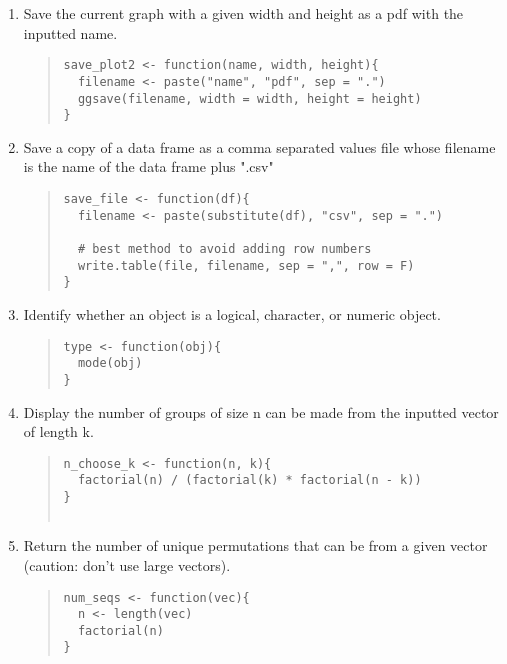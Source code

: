 \documentclass{article}
\begin{document}
\begin{enumerate}
\item Save the current graph with a given width and height as a pdf with the inputted name.
  \begin{quote}
    \begin{verbatim}
save_plot2 <- function(name, width, height){
  filename <- paste("name", "pdf", sep = ".")
  ggsave(filename, width = width, height = height)
}    
    \end{verbatim}
  \end{quote}
  
\item Save a copy of a data frame as a comma separated values file whose filename is the name of the data frame plus ".csv"
  \begin{quote}
    \begin{verbatim}
save_file <- function(df){
  filename <- paste(substitute(df), "csv", sep = ".")

  # best method to avoid adding row numbers
  write.table(file, filename, sep = ",", row = F)
}

    \end{verbatim}
  \end{quote}

\item Identify whether an object is a logical, character, or numeric object.
  \begin{quote}
    \begin{verbatim}
type <- function(obj){
  mode(obj)
}
    \end{verbatim}
  \end{quote}
  
\item Display the number of groups of size n can be made from the inputted vector of length k.
  \begin{quote}
    \begin{verbatim}
n_choose_k <- function(n, k){
  factorial(n) / (factorial(k) * factorial(n - k))
}
    
    \end{verbatim}
  \end{quote}

\item Return the number of unique permutations that can be from a given vector (caution: don't use large vectors).
  \begin{quote}
    \begin{verbatim}
num_seqs <- function(vec){
  n <- length(vec)
  factorial(n)
}    
    \end{verbatim}
  \end{quote}


\end{enumerate}
\end{document}
